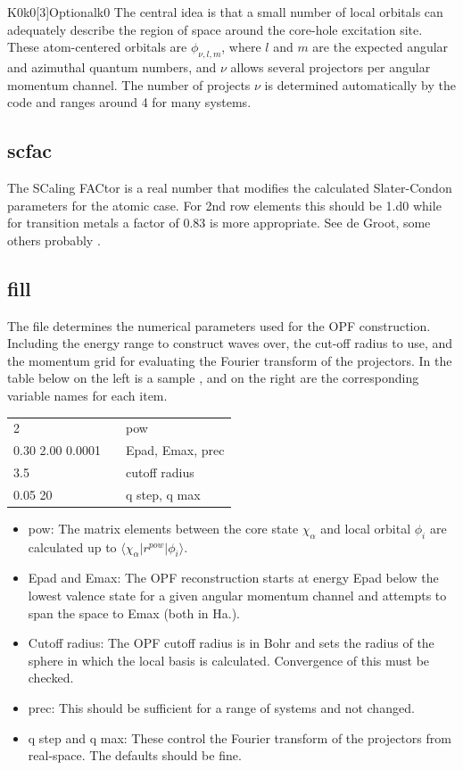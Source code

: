 \documentclass[11pt]{report}
\begin{document}
\begin{Card}{K0}{k0[3]}{Optional}{k0}
The central idea is that a small number of local orbitals can adequately describe the region of space around the 
core-hole excitation site. These atom-centered orbitals are $\phi_{\nu,l,m}$, where $l$ and $m$ are the 
expected angular and azimuthal quantum numbers, and $\nu$ allows several projectors per angular momentum channel. 
The number of projects $\nu$ is determined automatically by the code and ranges around 4 for many systems. 

\subsection{scfac}
The SCaling FACtor is a real number that modifies the calculated Slater-Condon parameters for the atomic case. For 2nd row elements this should be 1.d0 while for transition metals a factor of 0.83 is more appropriate. See de Groot, some others probably \cite{degroot.book}.

\subsection{fill}
\label{fill}
The  file determines the numerical parameters used for the OPF construction. Including the energy range to construct waves over,
the cut-off radius to use, and the momentum grid for evaluating the Fourier transform of the projectors. 
In the table below on the left is a sample , and on the right are the corresponding variable names for each item.

\begin{center}
\begin{tabular}{| l | c l |}
\hline
2						& &  pow \\
0.30 2.00 0.0001		& & Epad, Emax, prec \\
3.5 					& & cutoff radius \\
0.05 20					& & q step, q max \\
\hline
\end{tabular}
\end{center}

\begin{itemize}
\item pow: The matrix elements between the core state $\chi_\alpha$ and local orbital $\phi_i$ are calculated
 up to $\langle \chi_\alpha \vert r^{pow} \vert \phi_i \rangle$. 
\item Epad and Emax: The OPF reconstruction starts at energy Epad below the lowest valence state for a given angular momentum channel and attempts to span the space to Emax (both in Ha.). 
\item Cutoff radius: The OPF cutoff radius is in Bohr and sets the radius of the sphere in which the local basis is calculated. Convergence of this must be checked. 
\item prec: This should be sufficient for a range of systems and not changed.
\item q step and q max: These control the Fourier transform of the projectors from real-space. The defaults should be fine.
\end{itemize}



\end{Card}
\end{document}
